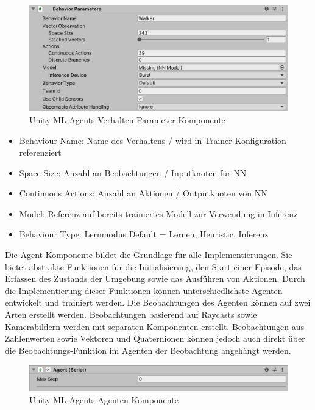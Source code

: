 \begin{figure}[H]
  \centering  
  \includegraphics[scale=0.5]{img/komponente_behavior_parameters.png}
  \caption{Unity ML-Agents Verhalten Parameter Komponente}
  \label{fig:komponente_behavior_parameters}
\end{figure}

\begin{itemize}
  \item Behaviour Name: Name des Verhaltens / wird in Trainer Konfiguration referenziert
  \item Space Size: Anzahl an Beobachtungen / Inputknoten für NN
  \item Continuous Actions: Anzahl an Aktionen / Outputknoten von NN
  \item Model: Referenz auf bereits trainiertes Modell zur Verwendung in Inferenz
  \item Behaviour Type: Lernmodus Default = Lernen, Heuristic, Inferenz
\end{itemize}

Die Agent-Komponente bildet die Grundlage für alle Implementierungen. Sie bietet abstrakte Funktionen für die Initialisierung, den Start einer Episode, das Erfassen des Zustands der Umgebung sowie das Ausführen von Aktionen. Durch die Implementierung dieser Funktionen können unterschiedlichste Agenten entwickelt und trainiert werden. Die Beobachtungen des Agenten können auf zwei Arten erstellt werden. Beobachtungen basierend auf Raycasts sowie Kamerabildern werden mit separaten Komponenten erstellt. Beobachtungen aus Zahlenwerten sowie Vektoren und Quaternionen können jedoch auch direkt über die Beobachtungs-Funktion im Agenten der Beobachtung angehängt werden.

\begin{figure}[H]
  \centering
  \includegraphics[scale=0.5]{img/komponente_agent.png}
  \caption{Unity ML-Agents Agenten Komponente}
  \label{fig:komponente_agent}
\end{figure}

